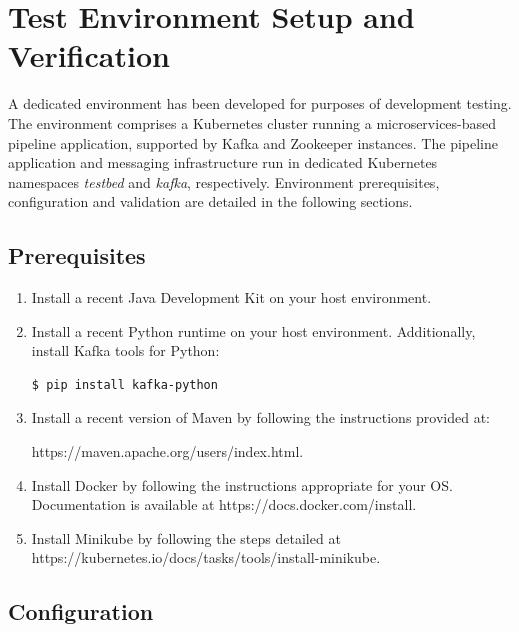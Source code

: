 \chapter{Test Environment Setup and Verification}

A dedicated environment has been developed for purposes of development testing. The environment comprises a Kubernetes cluster running a microservices-based pipeline application, supported by Kafka and Zookeeper instances. The pipeline application and messaging infrastructure run in dedicated Kubernetes namespaces  \textit{testbed} and  \textit{kafka}, respectively. Environment prerequisites, configuration and validation are detailed in the following sections.

\section{Prerequisites}
\begin{enumerate}
	
 \item Install a recent Java Development Kit on your host environment. 
	
 \item Install a recent Python runtime on your host environment. Additionally, install Kafka tools for Python:
 
 \begin{lstlisting}[language=bash]
 $ pip install kafka-python
 \end{lstlisting}

\item Install a recent version of Maven by following the instructions provided at:

https://maven.apache.org/users/index.html. 
	
 \item Install Docker by following the instructions appropriate for your OS. Documentation is available at https://docs.docker.com/install.
	
	
 \item Install Minikube by following the steps detailed at \linebreak https://kubernetes.io/docs/tasks/tools/install-minikube.

\end{enumerate}

\section{Configuration}

